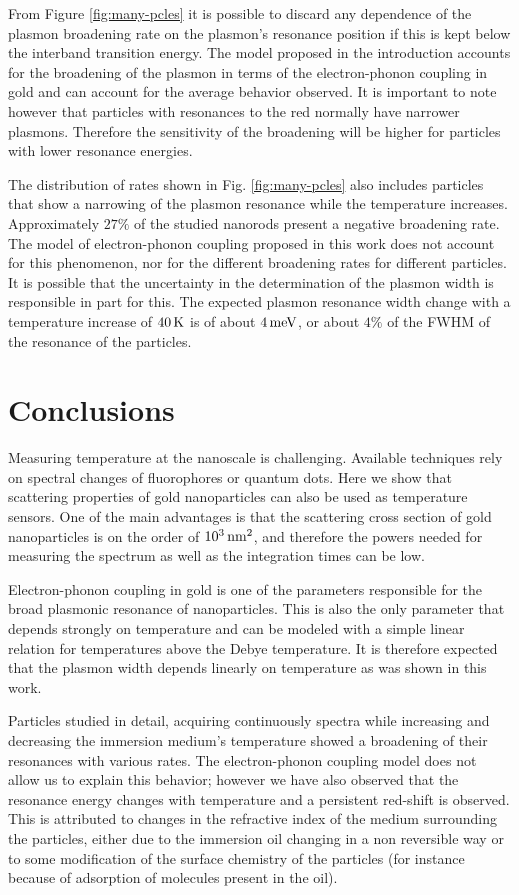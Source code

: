 From Figure \ref{fig:many-pcles} it is possible to discard any dependence of the
plasmon broadening rate on the plasmon's resonance position if this is kept
below the interband transition energy. The model proposed in the introduction
accounts for the broadening of the plasmon in terms of the electron-phonon
coupling in gold and can account for the average behavior observed. It is
important to note however that particles with resonances to the red normally
have narrower plasmons\cite{Sonnichsen2002}. Therefore the sensitivity of the
broadening will be higher for particles with lower resonance energies.

The distribution of rates shown in Fig. \ref{fig:many-pcles} also includes
particles that show a narrowing of the plasmon resonance while the temperature
increases. Approximately $27\%$ of the studied nanorods present a negative
broadening rate. The model of electron-phonon coupling proposed in this
work does not account for this phenomenon, nor for the different broadening
rates for different particles. It is possible that the uncertainty in the
determination of the plasmon width is responsible in part for this. The expected
plasmon resonance width change with a temperature increase of $40\,\textrm{K}$ is of about
$4\,\textrm{meV}$, or about $4\%$ of the FWHM of the resonance of the particles. 

\section{Conclusions}
Measuring temperature at the nanoscale is challenging. Available techniques rely
on spectral changes of fluorophores\cite{Chapman1995a} or quantum
dots\cite{Tanimoto2016,Yang2011a}. Here we show that scattering properties of
gold nanoparticles can also be used as temperature sensors. One of the main
advantages is that the scattering cross section of gold nanoparticles is on the
order of $10^3\,\textrm{nm}^2$, and therefore the powers needed for measuring the spectrum
as well as the integration times can be low.

Electron-phonon coupling in gold is one of the parameters responsible for
the broad plasmonic resonance of nanoparticles. This is also the only
parameter that depends strongly on temperature and can be modeled with a
simple linear relation for temperatures above the Debye temperature. It is
therefore expected that the plasmon width depends linearly on temperature as was
shown in this work. 

Particles studied in detail, acquiring continuously spectra while increasing and
decreasing the immersion medium's temperature showed a broadening of their
resonances with various rates. The electron-phonon coupling model does not allow
us to explain this behavior; however we have also observed that the resonance
energy changes with temperature and a persistent red-shift is observed. This is
attributed to changes in the refractive index of the medium surrounding the
particles, either due to the immersion oil changing in a non reversible way or
to some modification of the surface chemistry of the particles (for instance
because of adsorption of molecules present in the oil).

